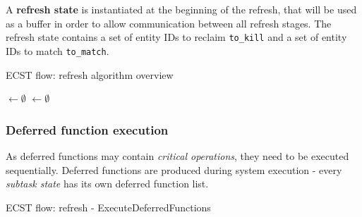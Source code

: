 \documentclass[twoside, 12pt, a4paper, openany]{book}
\begin{document}
A \textbf{refresh state} is instantiated at the beginning of the
refresh, that will be used as a buffer in order to allow communication
between all refresh stages. The refresh state contains a set of entity
IDs to reclaim
\texttt{to_kill}
and a set of entity IDs to match
\texttt{to_match}.

\begin{algorithm}[H]
\caption{ECST flow: refresh algorithm overview}
\footnotesize


    \ToKill $\longleftarrow \emptyset$\;
    \ToMatch $\longleftarrow \emptyset$\;
    \BlankLine
    \ExecuteDeferredFunctions{\ToKill, \ToMatch} 
    \ReclaimDeadEntities{\ToKill} 
    \MatchEntitiesToSystems{\ToMatch} 

\end{algorithm}

\hypertarget{flow_exec_dfuncs}{\subsubsection{Deferred function
execution}\label{flow_exec_dfuncs}}

As deferred functions may contain \emph{critical operations}, they need
to be executed sequentially. Deferred functions are produced during
system execution - every \emph{subtask state} has its own deferred
function list.

\begin{algorithm}[H]
\caption{ECST flow: refresh - ExecuteDeferredFunctions}
\footnotesize



\end{algorithm}
\end{document}
